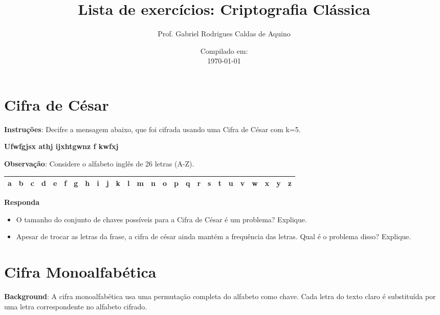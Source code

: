 \title{Lista de exercícios: Criptografia Clássica}
\author{Prof. Gabriel Rodrigues Caldas de Aquino}
\date{Compilado em: \\ \today}



\maketitle

\section{Cifra de César}

\textbf{Instruções}:
Decifre a mensagem abaixo, que foi cifrada usando uma Cifra de César com k=5.

\textbf{Ufwfgjsx athj ijxhtgwnz f kwfxj}

\textbf{Observação}: Considere o alfabeto inglês de 26 letras (A-Z).


\begin{table}[h]
    \centering
    \begin{tabular}{|*{26}{c|}}
        \hline
        a & b & c & d & e & f & g & h & i & j & k & l & m & n & o & p & q & r & s & t & u & v & w & x & y & z \\

        \hline
    \end{tabular}
\end{table}



\textbf{Responda}
\begin{itemize}
    \item O tamanho do conjunto de chaves possíveis para a Cifra de César é um problema? Explique.



    \item Apesar de trocar as letras da frase, a cifra de césar ainda mantém a frequência das letras. Qual é o problema disso? Explique.


\end{itemize}

\section{Cifra Monoalfabética}
\textbf{Background}: A cifra monoalfabética usa uma permutação completa do alfabeto como chave. Cada letra do texto claro é substituída por uma letra correspondente no alfabeto cifrado.

